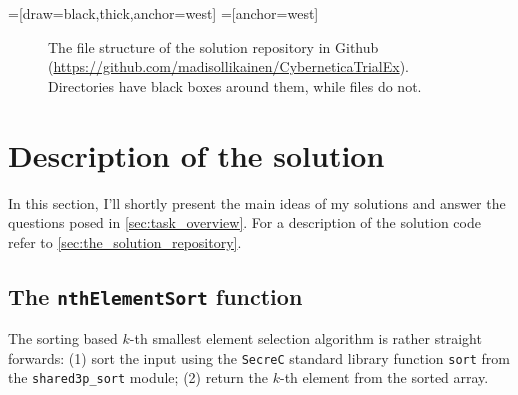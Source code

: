 \documentclass[11pt]{article}
\newcommand{\ct}[1]{\texttt{#1}}
\newcommand{\SC}{\ct{SecreC}\xspace}
\begin{document}
=[draw=black,thick,anchor=west]
=[anchor=west]
\begin{figure}[h]
\centering
\caption{The file structure of the solution repository in Github (\url{https://github.com/madisollikainen/CyberneticaTrialEx}). Directories have black boxes around them, while files do not.}
\label{fig:solution_file_structure}
\end{figure}



\section{Description of the solution} %
\label{sec:description_of_the_solution}

In this section, I'll shortly present the main ideas of my solutions and answer the questions posed in \cref{sec:task_overview}. For a description of the solution code refer to \cref{sec:the_solution_repository}. 

\subsection{The \ct{nthElementSort} function} %
\label{sub:nthelementsort}

The sorting based $k$-th smallest element selection algorithm is rather straight forwards: (1) sort the input using the \SC standard library function \ct{sort} from the \ct{shared3p\_sort} module; (2) return the $k$-th element from the sorted array. 
\end{document}
